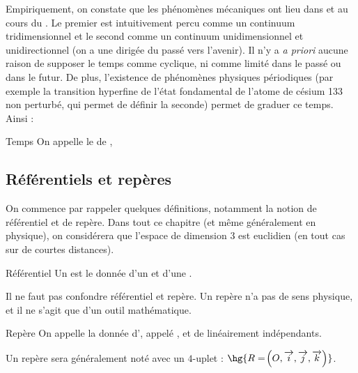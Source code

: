 \documentclass[a4paper,french,bookmarks]{book}
\begin{document}
    Empiriquement, on constate que les phénomènes mécaniques ont lieu dans  et au cours du . Le premier est intuitivement percu comme un continuum tridimensionnel et le second comme un continuum unidimensionnel et unidirectionnel (on a une  dirigée du passé vers l'avenir). Il n'y a \textit{a priori} aucune raison de supposer le temps comme cyclique, ni comme limité dans le passé ou dans le futur. De plus, l'existence de phénomènes physiques périodiques (par exemple la transition hyperfine de l'état fondamental de l'atome de césium 133 non perturbé, qui permet de définir la seconde) permet de graduer ce temps. Ainsi :
    \begin{definition}{Temps}{}
        On appelle  le  de , 
    \end{definition}
    
    \subsection{Référentiels et repères}
    
    On commence par rappeler quelques définitions, notamment la notion de référentiel et de repère. Dans tout ce chapitre (et même généralement en physique), on considérera que l'espace de dimension $3$ est euclidien (en tout cas sur de courtes distances).
    
    \begin{definition}{Référentiel}{}
        Un  est le donnée d'un  et d'une .
    \end{definition}
    
    Il ne faut pas confondre référentiel et repère. Un repère n'a pas de sens physique, et il ne s'agit que d'un outil mathématique.
    
    \begin{definition}{Repère}{}
        On appelle  la donnée d', appelé , et de  linéairement indépendants.
    \end{definition}
    
    \begin{notation}
        Un repère  sera généralement noté avec un $4$-uplet : $\hg{R = \p{O, \vec i, \vec j, \vec k}}$.
    \end{notation}
    
\end{document}
